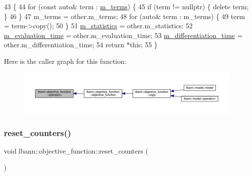 \begin{DoxyCode}
43                                                                                  \{
44   \textcolor{keywordflow}{for} (\textcolor{keyword}{const} \textcolor{keyword}{auto}& term : \hyperlink{classlbann_1_1objective__function_aea9c1f90ba9af1b1330efa2ba6adb5e2}{m\_terms}) \{
45     \textcolor{keywordflow}{if} (term != \textcolor{keyword}{nullptr}) \{ \textcolor{keyword}{delete} term; \}
46   \}
47   m\_terms = other.m\_terms;
48   \textcolor{keywordflow}{for} (\textcolor{keyword}{auto}& term : m\_terms) \{
49     term = term->copy();
50   \}
51   \hyperlink{classlbann_1_1objective__function_ad5daa18c52374a849c6fbd515bcc1eb1}{m\_statistics} = other.m\_statistics;
52   \hyperlink{classlbann_1_1objective__function_a9ef17c7204cd371261c9c083d86de91a}{m\_evaluation\_time} = other.m\_evaluation\_time;
53   \hyperlink{classlbann_1_1objective__function_ae526559f3a530f540a29407ea64bbea6}{m\_differentiation\_time} = other.m\_differentiation\_time;
54   \textcolor{keywordflow}{return} *\textcolor{keyword}{this};
55 \}
\end{DoxyCode}
Here is the caller graph for this function\+:\nopagebreak
\begin{figure}[H]
\begin{center}
\leavevmode
\includegraphics[width=350pt]{classlbann_1_1objective__function_ab0695b92af6dec63912e5ef0cb81b953_icgraph}
\end{center}
\end{figure}
\mbox{\label{classlbann_1_1objective__function_a92b248be17049b1d7e82accbd913d6f1}} 
\subsubsection{\texorpdfstring{reset\+\_\+counters()}{reset\_counters()}}
{\footnotesize\ttfamily void lbann\+::objective\+\_\+function\+::reset\+\_\+counters (\begin{DoxyParamCaption}{ }\end{DoxyParamCaption})\hspace{0.3cm}{\ttfamily [inline]}}

